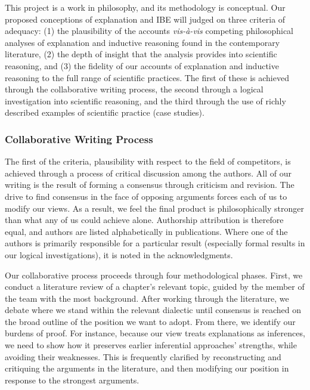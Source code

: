 \documentclass{article}[11pt]
\begin{document}
This project is a work in philosophy, and its methodology is conceptual.  Our proposed conceptions of explanation and IBE will judged on three criteria of adequacy: (1) the plausibility of the accounts \textit{vis-\`{a}-vis} competing philosophical analyses of explanation and inductive reasoning found in the contemporary literature,  (2) the depth of insight that the analysis provides into scientific reasoning, and (3)  the fidelity of our accounts of explanation and inductive reasoning to the full range of scientific practices.  The first of these is achieved through the collaborative writing process, the second through a logical investigation into scientific reasoning, and the third through the use of richly described examples of scientific practice (case studies). 

\subsubsection*{Collaborative Writing Process}

The first of the criteria, plausibility with respect to the field of competitors, is achieved through a process of critical discussion among the authors.   All of our writing is the result of forming a consensus through criticism and revision.  The drive to find consensus in the face of opposing arguments forces each of us to modify our views.  As a result, we feel the final product is philosophically stronger than what any of us could achieve alone.  Authorship attribution is therefore equal, and authors are listed alphabetically in publications.  Where one of the authors is primarily responsible for a particular result (especially formal results in our logical investigations), it is noted in the acknowledgments. 

Our collaborative process proceeds through four methodological phases.  First, we conduct a literature review of a chapter’s relevant topic, guided by the member of the team with the most background. After working through the literature, we debate where we stand within the relevant dialectic until consensus is reached on the broad outline of the position we want to adopt. From there, we identify our burdens of proof. For instance, because our view treats explanations as inferences, we need to show how it preserves earlier inferential approaches' strengths, while avoiding their weaknesses. This is frequently clarified by reconstructing  and critiquing the arguments in the literature, and then modifying our position in response to the strongest arguments. 
\end{document}
